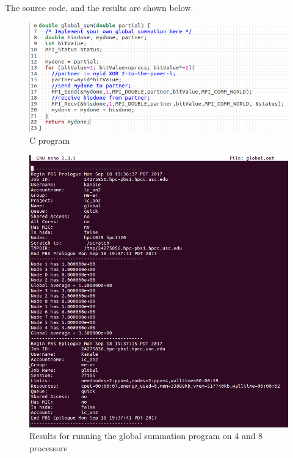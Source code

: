 \documentclass[11pt, oneside]{article}   	%
\begin{document}
%
The source code, and the results are shown below.
	\begin{figure}
		\centering
		\includegraphics[scale=0.6]{globalProg.png}
		\caption{C program}
	\end{figure}
	\begin{figure}
		\centering
		\includegraphics[scale=0.4]{globalSum.png}
		\caption{Results for running the global summation program on 4 and 8 processors}
	\end{figure}
\end{document}
